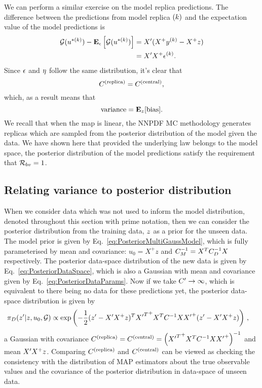 We can perform a similar exercise on the model replica predictions. The difference
between the predictions from model replica $(k)$ and the expectation value
of the model predictions is
\begin{equation}
    \begin{split}
        \mathcal{G}(u^{* (k)}) - \mathbf{E}_{\epsilon}\left[ \mathcal{G}(u^{* (k)}) \right] &= X^\prime (X^+ y^{(k)} - X^+ z) \\
        &= X^\prime X^+ \epsilon^{(k)}.
    \end{split}
\end{equation}
Since $\epsilon$ and $\eta$ follow the same distribution, it's clear that
\begin{equation}
    C^{(\rm replica)} = C^{(\rm central)},
\end{equation}
which, as a result means that
\begin{equation}
    {\rm variance} = \mathbf{E}_{z}[{\rm bias}].
\end{equation}
We recall that when the map is linear, the NNPDF MC methodology generates replicas
which are sampled from the posterior distribution of the model given the data.
We have shown here that provided the underlying law belongs to the model
space, the posterior distribution of the model predictions satisfy the
requirement that $\mathcal{R}_{bv} = 1$.

\subsection{Relating variance to posterior distribution}

When we consider data which was not used to inform the model distribution,
denoted throughout this section with prime notation, then we can consider the posterior
distribution from the training data, $z$ as a prior for the unseen data.
The model prior is given by Eq.~\ref{eq:PosteriorMultiGaussModel}, which is fully
parameterised by mean and covariance: $u_0 = X^+ z$ and
$C_M^{-1} = X^TC^{-1}_{D}X$ respectively. The posterior data-space distribution
of the new data is given by Eq.~\ref{eq:PosteriorDataSpace}, which is also a
Gaussian with mean and covariance given by Eq.~\ref{eq:PosteriorDataParams}.
Now if we take ${C^{\prime}} \to \infty$, which is equivalent to there being
no data for these predictions yet, the posterior data-space distribution
is given by
\begin{equation}
    \begin{split}
        \pi_D(z^\prime|z,u_0,\mathcal{G}) &\propto \exp
        \left( - \frac{1}{2}
            (z^\prime - X^\prime X^+ z)^T
            {{X^\prime}^T}^+ X^T C^{-1}_{} X {X^\prime}^+
            (z^\prime - X^\prime X^+ z)
        \right) \, ,
    \end{split}
\end{equation}
a Gaussian with covariance
$C^{(\rm replica)} = C^{(\rm central)} = \left({{X^\prime}^T}^+ X^T C^{-1}_{} X {X^\prime}^+ \right)^{-1}$
and mean $X^\prime X^+ z$. Comparing $C^{(\rm replica)}$ and $C^{(\rm central)}$ can be viewed
as checking the consistency with the distribution of MAP estimators about the
true observable values and the covariance of the posterior distribution
in data-space of unseen data.

